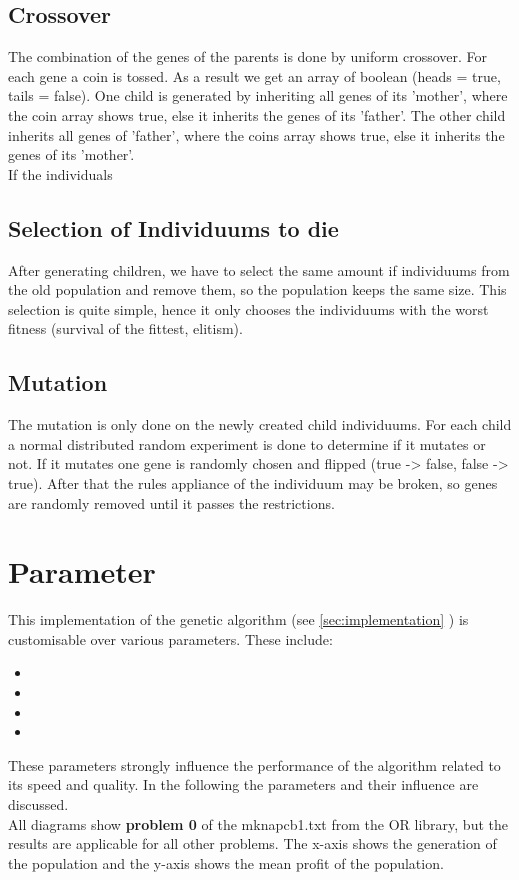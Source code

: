 \documentclass[fontsize=12pt,toc=bibliography, notitlepage]{scrreprt}
\newcommand{\refnn}[1]{\ref{#1} \nameref{#1}}
\begin{document}
\subsection{Crossover}
\label{subsec:crossover}
The combination of the genes of the parents is done by uniform crossover. For each gene a coin is tossed. As a result we get an array of boolean (heads = true, tails = false). One child is generated by inheriting all genes of its 'mother', where the coin array shows true, else it inherits the genes of its 'father'. The other child inherits all genes of 'father', where the coins array shows true, else it inherits the genes of its 'mother'. \\
If the individuals

\subsection{Selection of Individuums to die}
\label{subsec:selection-of-individuums-to-die}
After generating children, we have to select the same amount if individuums from the old population and remove them, so the population keeps the same size. This selection is quite simple, hence it only chooses the individuums with the worst fitness (survival of the fittest, elitism).

\subsection{Mutation}
\label{subsec:mutation}
The mutation is only done on the newly created child individuums. For each child a normal distributed random experiment is done to determine if it mutates or not. If it mutates one gene is randomly chosen and flipped (true -> false, false -> true). After that the rules appliance of the individuum may be broken, so genes are randomly removed until it passes the restrictions. 

\section{Parameter}
\label{sec:parameter}
This implementation of the genetic algorithm (see \refnn{sec:implementation}) is customisable over various parameters. These include:
\begin{itemize}
	\item {}
	\item {}
	\item {}
	\item {}
\end{itemize}
These parameters strongly influence the performance of the algorithm related to its speed and quality. In the following the parameters and their influence are discussed.\\
All diagrams show \textbf{problem 0} of the mknapcb1.txt from the OR library, but the results are applicable for all other problems. The x-axis shows the generation of the population and the y-axis shows the mean profit of the population.
\end{document}
